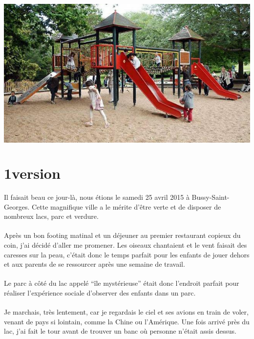 \begin{center}
	\includegraphics[scale=0.7]{enfants.jpg}
\end{center}

\section{1\iere version}

\paragraph{} Il faisait beau ce jour-là, nous étions le samedi 25 avril 2015 à
Bussy-Saint-Georges. Cette magnifique ville a le mérite d'être verte et de
disposer de nombreux lacs, parc et verdure.

\paragraph{} Après un bon footing matinal et un déjeuner au premier restaurant
copieux du coin, j'ai décidé d'aller me promener. Les oiseaux chantaient et le
vent faisait des caresses sur la peau, c'était donc le temps parfait pour les
enfants de jouer dehors et aux parents de se ressourcer après une semaine de
travail.

\paragraph{} Le parc à côté du lac appelé ``île mystérieuse'' était donc
l'endroit parfait pour réaliser l'expérience sociale d'observer des enfants
dans un parc.

\paragraph{} Je marchais, très lentement, car je regardais le ciel et ses
avions en train de voler, venant de pays si lointain, comme la Chine ou
l'Amérique. Une fois arrivé près du lac, j'ai fait le tour avant de trouver un
banc où personne n'était assis dessus.

